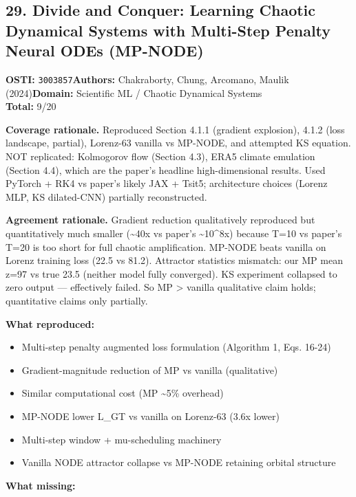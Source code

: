 \subsection{29. Divide and Conquer: Learning Chaotic Dynamical Systems with Multi-Step Penalty Neural ODEs (MP-NODE)}
\textbf{OSTI:} \texttt{3003857}\quad\textbf{Authors:} Chakraborty, Chung, Arcomano, Maulik (2024)\quad\textbf{Domain:} Scientific ML / Chaotic Dynamical Systems\\
\quad{}\quad\textbf{Total:} 9/20\par\smallskip
\noindent\textbf{Coverage rationale.} Reproduced Section 4.1.1 (gradient explosion), 4.1.2 (loss landscape, partial), Lorenz-63 vanilla vs MP-NODE, and attempted KS equation. NOT replicated: Kolmogorov flow (Section 4.3), ERA5 climate emulation (Section 4.4), which are the paper's headline high-dimensional results. Used PyTorch + RK4 vs paper's likely JAX + Tsit5; architecture choices (Lorenz MLP, KS dilated-CNN) partially reconstructed.\par
\noindent\textbf{Agreement rationale.} Gradient reduction qualitatively reproduced but quantitatively much smaller (\textasciitilde{}40x vs paper's \textasciitilde{}10\textasciicircum{}8x) because T=10 vs paper's T=20 is too short for full chaotic amplification. MP-NODE beats vanilla on Lorenz training loss (22.5 vs 81.2). Attractor statistics mismatch: our MP mean z=97 vs true 23.5 (neither model fully converged). KS experiment collapsed to zero output --- effectively failed. So MP \textgreater{} vanilla qualitative claim holds; quantitative claims only partially.\par\smallskip
\noindent\textbf{What reproduced:}
\begin{itemize}[leftmargin=1.4em,itemsep=0.2em,topsep=0.2em]
\item Multi-step penalty augmented loss formulation (Algorithm 1, Eqs. 16-24)
\item Gradient-magnitude reduction of MP vs vanilla (qualitative)
\item Similar computational cost (MP \textasciitilde{}5\% overhead)
\item MP-NODE lower L\_GT vs vanilla on Lorenz-63 (3.6x lower)
\item Multi-step window + mu-scheduling machinery
\item Vanilla NODE attractor collapse vs MP-NODE retaining orbital structure
\end{itemize}\noindent\textbf{What missing:}
